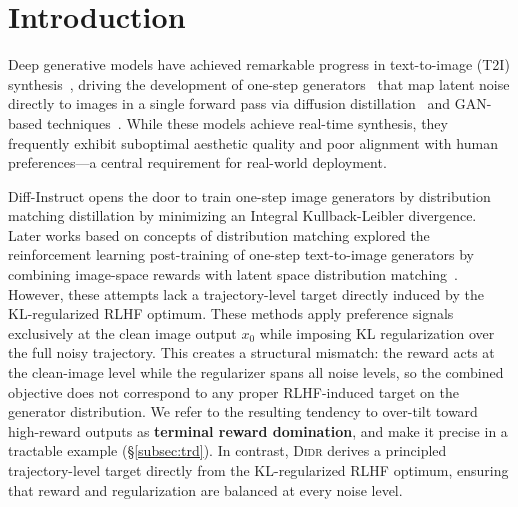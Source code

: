 \section{Introduction}

Deep generative models have achieved remarkable progress in text-to-image (T2I) synthesis~\citep{rombach2022high,saharia2022photorealistic,ramesh2022hierarchical,esser2024scaling,nichol2021improved,karras2020analyzing}, driving the development of one-step generators~\citep{Luo2023DiffInstructAU,yin2024improved,zhou2024long,sauer2023stylegan,kang2023gigagan,zheng2024diffusion,liu2023instaflow,xu2024ufogen} that map latent noise directly to images in a single forward pass via diffusion distillation~\citep{luo2023comprehensive} and GAN-based techniques~\citep{goodfellow2014generative,sauer2023adversarial,zheng2025ultra}. While these models achieve real-time synthesis, they frequently exhibit suboptimal aesthetic quality and poor alignment with human preferences---a central requirement for real-world deployment.

Diff-Instruct\citep{luo2023diffinstruct} opens the door to train one-step image generators by distribution matching distillation\citep{yin2023one} by minimizing an Integral Kullback-Leibler divergence. Later works based on concepts of distribution matching explored the reinforcement learning post-training of one-step text-to-image generators by combining image-space rewards with latent space distribution matching~\citep{anonymous2024diffinstruct,luo2024onestep}. However, these attempts lack a trajectory-level target directly induced by the KL-regularized RLHF optimum. These methods apply preference signals exclusively at the clean image output $x_0$ while imposing KL regularization over the full noisy trajectory. This creates a structural mismatch: the reward acts at the clean-image level while the regularizer spans all noise levels, so the combined objective does not correspond to any proper RLHF-induced target on the generator distribution. We refer to the resulting tendency to over-tilt toward high-reward outputs as \textbf{terminal reward domination}, and make it precise in a tractable example (\S\ref{subsec:trd}). In contrast, \textsc{Didr} derives a principled trajectory-level target directly from the KL-regularized RLHF optimum, ensuring that reward and regularization are balanced at every noise level.

